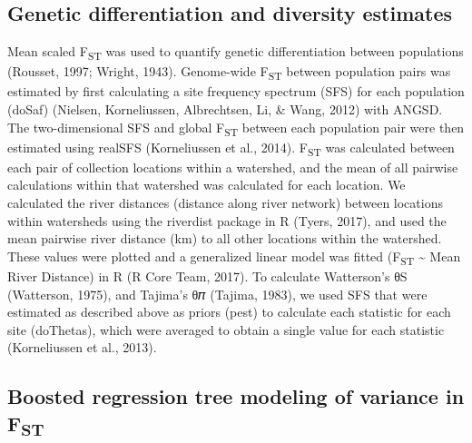 \documentclass[proquest,12pt,final]{ucthesis-CA2012} %
\begin{document}
\begin{ucmainmatter}
\hypertarget{genetic-differentiation-and-diversity-estimates}{%
\subsection{Genetic differentiation and diversity
estimates}\label{genetic-differentiation-and-diversity-estimates}}

Mean scaled F\textsubscript{ST} was used to quantify genetic
differentiation between populations (Rousset, 1997; Wright, 1943).
Genome-wide F\textsubscript{ST} between population pairs was estimated
by first calculating a site frequency spectrum (SFS) for each population
(doSaf) (Nielsen, Korneliussen, Albrechtsen, Li, \& Wang, 2012) with
ANGSD. The two-dimensional SFS and global F\textsubscript{ST} between
each population pair were then estimated using realSFS (Korneliussen et
al., 2014). F\textsubscript{ST} was calculated between each pair of
collection locations within a watershed, and the mean of all pairwise
calculations within that watershed was calculated for each location. We
calculated the river distances (distance along river network) between
locations within watersheds using the riverdist package in R (Tyers,
2017), and used the mean pairwise river distance (km) to all other
locations within the watershed. These values were plotted and a
generalized linear model was fitted (F\textsubscript{ST}
\textasciitilde{} Mean River Distance) in R (R Core Team, 2017). To
calculate Watterson's θS (Watterson, 1975), and Tajima's θ𝜋 (Tajima,
1983), we used SFS that were estimated as described above as priors
(pest) to calculate each statistic for each site (doThetas), which were
averaged to obtain a single value for each statistic (Korneliussen et
al., 2013).

\hypertarget{boosted-regression-tree-modeling-of-variance-in-fst}{%
\subsection{\texorpdfstring{Boosted regression tree modeling of variance
in
F\textsubscript{ST}}{Boosted regression tree modeling of variance in FST}}\label{boosted-regression-tree-modeling-of-variance-in-fst}}


\end{ucmainmatter}
\end{document}
